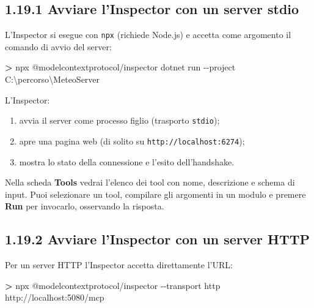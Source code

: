 \documentclass[
  italian,
  10pt,
]{book}
\newenvironment{Shaded}{\begin{snugshade}}{\end{snugshade}}
\newcommand{\AttributeTok}[1]{\textcolor[rgb]{0.13,0.29,0.53}{#1}}
\newcommand{\DataTypeTok}[1]{\textcolor[rgb]{0.13,0.29,0.53}{#1}}
\newcommand{\ExtensionTok}[1]{#1}
\newcommand{\NormalTok}[1]{#1}
\newcommand{\OperatorTok}[1]{\textcolor[rgb]{0.81,0.36,0.00}{\textbf{#1}}}
\providecommand{\tightlist}{%
  \setlength{\itemsep}{0pt}\setlength{\parskip}{0pt}}
\begin{document}
\subsection{1.19.1 Avviare l'Inspector con un server
stdio}\label{avviare-linspector-con-un-server-stdio}

L'Inspector si esegue con \texttt{npx} (richiede Node.js) e accetta come
argomento il comando di avvio del server:

\begin{Shaded}
\begin{Highlighting}[]
\OperatorTok{\textgreater{}}\NormalTok{ npx }\ExtensionTok{@modelcontextprotocol/inspector}\NormalTok{ dotnet run }\AttributeTok{{-}{-}project}\NormalTok{ C:}\DataTypeTok{\textbackslash{}p}\NormalTok{ercorso}\DataTypeTok{\textbackslash{}M}\NormalTok{eteoServer}
\end{Highlighting}
\end{Shaded}

L'Inspector:

\begin{enumerate}
\def\labelenumi{\arabic{enumi}.}
\tightlist
\item
  avvia il server come processo figlio (trasporto \texttt{stdio});
\item
  apre una pagina web (di solito su \texttt{http://localhost:6274});
\item
  mostra lo stato della connessione e l'esito dell'handshake.
\end{enumerate}

Nella scheda \textbf{Tools} vedrai l'elenco dei tool con nome,
descrizione e schema di input. Puoi selezionare un tool, compilare gli
argomenti in un modulo e premere \textbf{Run} per invocarlo, osservando
la risposta.

\subsection{1.19.2 Avviare l'Inspector con un server
HTTP}\label{avviare-linspector-con-un-server-http}

Per un server HTTP l'Inspector accetta direttamente l'URL:

\begin{Shaded}
\begin{Highlighting}[]
\OperatorTok{\textgreater{}}\NormalTok{ npx }\ExtensionTok{@modelcontextprotocol/inspector} \AttributeTok{{-}{-}transport}\NormalTok{ http http://localhost:5080/mcp}
\end{Highlighting}
\end{Shaded}
\end{document}
